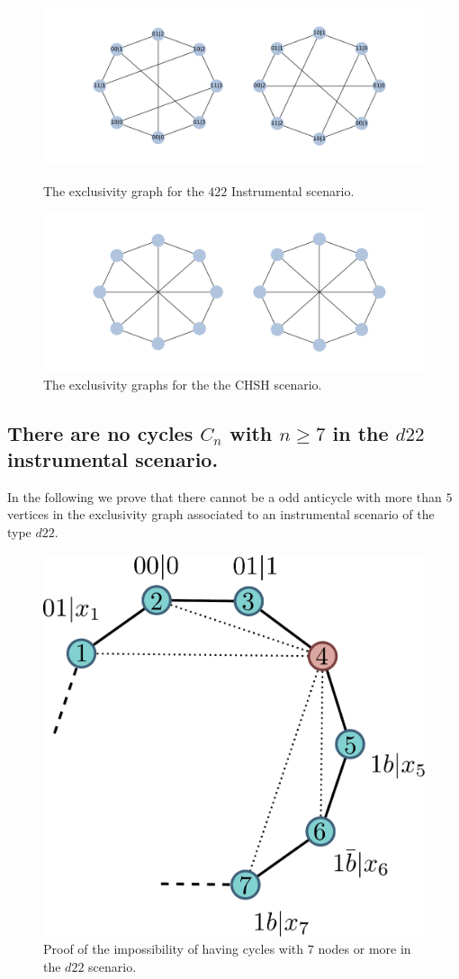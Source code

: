 \documentclass[letterpaper]{article}
\begin{document}
\begin{figure}[b]
    \centering
    \parbox{.9\columnwidth}{
        \includegraphics[width=\columnwidth]{images/422_exgraph.pdf}
        \caption{The exclusivity graph for the $422$ Instrumental scenario.}
        \label{fig:422_exgraph}
    }

    \bigskip
    \parbox{.9\columnwidth}{
        \includegraphics[width=.8\columnwidth]{images/chsh_exgraph.pdf}
        \caption{The exclusivity graphs for the the CHSH scenario.}
        \label{fig:chsh_exgraph}
    }
\end{figure}

\subsection{There are no cycles $C_n$ with $n \ge 7$ in the $d22$ instrumental scenario.}
In the following we prove that there cannot be a odd anticycle with more than $5$ vertices in the exclusivity graph associated to an instrumental scenario of the type $d22$.

\begin{figure}[h]
    \centering
    \includegraphics[width=.6\columnwidth]{images/cycle_proof.pdf}
    \caption{Proof of the impossibility of having cycles with $7$ nodes or more
    in the $d22$ scenario.}
    \label{fig:cycle_graph_proof}
\end{figure}
\end{document}
